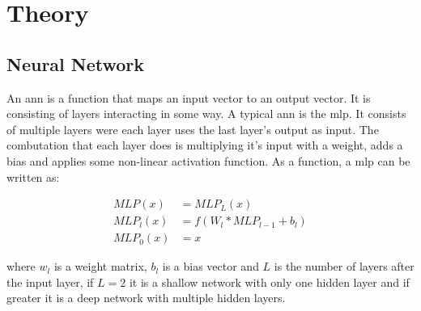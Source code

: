 \section{Theory} %


\subsection{Neural Network}
		
An \gls{ann} is a function that maps an input vector to an output vector. 
It is consisting of layers interacting in some way. A typical \gls{ann} is the \gls{mlp}.
It consists of multiple layers were each layer uses the last layer's output as input.
The combutation that each layer does is multiplying it's input with a weight, adds a bias and applies 
some non-linear activation function. As a function, a \gls{mlp} can be written as:

\begin{align*}
	MLP(x) &= MLP_L(x) \\
	MLP_l(x) &= f(W_l * MLP_{l-1} + b_l) \\
	MLP_0(x) &= x
\end{align*}

where $w_l$ is a weight matrix, $b_l$ is a bias vector and $L$ is the number of layers after the 
input layer, if $L=2$ it is a shallow network with only one hidden layer and if greater it is a deep network
with multiple hidden layers.

